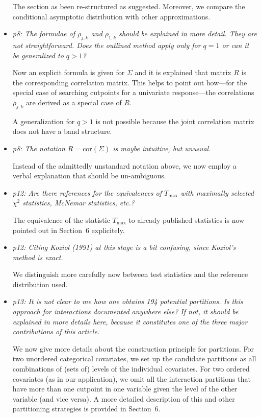 \documentclass[11pt,a4paper]{article}
\begin{document}
\begin{itemize}
	The section as been re-structured as suggested. Moreover, 
        we compare the conditional asymptotic distribution with
        other approximations.
	
  \item \textit{p8: The formulae of $\rho_{j,k}$ and $\rho_{1,k}$ should be
        explained in more detail. They are not straightforward. Does the outlined
	method apply only for $q = 1$ or can it be generalized to $q > 1$?}
	
	Now an explicit formula is given for $\Sigma$ and it is explained that
	matrix $R$ is the corresponding correlation matrix. This
	helps to point out how---for the special case of searching cutpoints
	for a univariate response---the correlations $\rho_{j, k}$ are
	derived as a special case of $R$.
	
	A generalization for $q > 1$ is not possible because the joint correlation
	matrix does not have a band structure.
	
  \item \textit{p8: The notation $R = \mbox{cor}(\Sigma)$ is maybe intuitive, but unusual.}
  
        Instead of the admittedly unstandard notation above, we now employ
	a verbal explanation that should be un-ambiguous.
	
  \item \textit{p12: Are there references for the equivalences of $T_{\max}$ with maximally
        selected $\chi^2$ statistics, McNemar statistics, etc.?}
	
	The equivalence of the statistic $T_\text{max}$ to already published
        statistics is now pointed out in Section~6 explicitely.
	
  \item \textit{p12: Citing Koziol (1991) at this stage is a bit confusing, since
        Koziol's method is exact.}
	
	We distinguish more carefully now between test statistics and the reference
	distribution used.
	
  \item \textit{p13: It is not clear to me how one obtains 194 potential partitions.
        Is this approach for interactions documented anywhere else? If not, it should be
        explained in more details here, because it constitutes one of the three major
        contributions of this article.}
	
	We now give more details about the construction principle for partitions.
        For two unordered categorical covariates, we set up the candidate partitions
	as all combinations of (sets of) levels of the individual covariates.	
	For two ordered covariates (as in our application), we omit all the interaction
	partitions that have more than one cutpoint in one variable given the
	level of the other variable (and vice versa). A more detailed description of
	this and other partitioning strategies is provided in Section~6.
	

\end{itemize}
\end{document}
